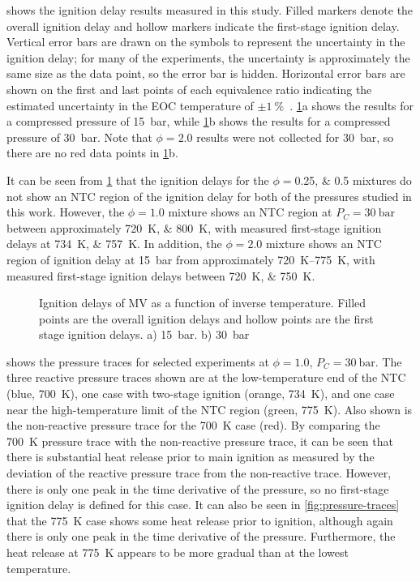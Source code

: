 \documentclass[12pt]{../ussci}
\begin{document}
 shows the ignition delay results measured in this
study. Filled markers denote the overall ignition delay and hollow markers
indicate the first-stage ignition delay. Vertical error bars are drawn on the
symbols to represent the uncertainty in the ignition delay; for many of the
experiments, the uncertainty is approximately the same size as the data point,
so the error bar is hidden. Horizontal error bars are shown on the first and
last points of each equivalence ratio indicating the estimated uncertainty in
the EOC temperature of $\pm\SI{1}{\percent}$~\autocite{Weber2015}.
\cref{fig:ignition-delays}a shows the results for a compressed pressure of
\SI{15}{\bar}, while \cref{fig:ignition-delays}b shows the results for a
compressed pressure of \SI{30}{\bar}. Note that $\phi=2.0$ results were not
collected for \SI{30}{\bar}, so there are no red data points in
\cref{fig:ignition-delays}b.

It can be seen from \cref{fig:ignition-delays} that the ignition delays for the
\(\phi=\)\numlist{0.25;0.5} mixtures do not show an NTC region of the ignition
delay for both of the pressures studied in this work. However, the $\phi=1.0$
mixture shows an NTC region at $P_C=\SI{30}{\bar}$ between approximately
\SIlist{720;800}{\K}, with measured first-stage ignition delays at
\SIlist{734;757}{\K}. In addition, the $\phi=2.0$ mixture shows an NTC region of
ignition delay at \SI{15}{\bar} from approximately \SIrange{720}{775}{\K}, with
measured first-stage ignition delays between \SIlist{720;750}{\K}.

\begin{figure}[htb]
    \centering
    
    \caption{Ignition delays of MV as a function of inverse temperature. Filled
    points are the overall ignition delays and hollow points are the first stage
    ignition delays. a) \SI{15}{\bar}. b) \SI{30}{\bar}}
    \label{fig:ignition-delays}
\end{figure}

 shows the pressure traces for selected experiments at
\(\phi=1.0\), \(P_C =\SI{30}{\bar}\). The three reactive pressure traces shown
are at the low-temperature end of the NTC (blue, \SI{700}{\K}), one case with
two-stage ignition (orange, \SI{734}{\K}), and one case near the
high-temperature limit of the NTC region (green, \SI{775}{\K}). Also shown is
the non-reactive pressure trace for the \SI{700}{\K} case (red). By comparing
the \SI{700}{\K} pressure trace with the non-reactive pressure trace, it can be
seen that there is substantial heat release prior to main ignition as measured
by the deviation of the reactive pressure trace from the non-reactive trace.
However, there is only one peak in the time derivative of the pressure, so no
first-stage ignition delay is defined for this case. It can also be seen in
\cref{fig:pressure-traces} that the \SI{775}{\K} case shows some heat release
prior to ignition, although again there is only one peak in the time derivative
of the pressure. Furthermore, the heat release at \SI{775}{\K} appears to be
more gradual than at the lowest temperature.
\end{document}
